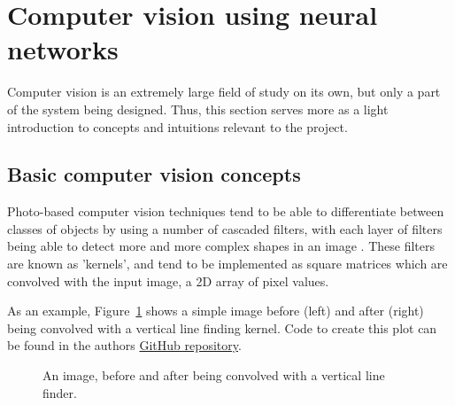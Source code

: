 \section{Computer vision using neural networks}

Computer vision is an extremely large field of study on its own, but only a part of the system being designed. Thus, this section serves more as a light introduction to concepts and intuitions relevant to the project.

\subsection{Basic computer vision concepts}
Photo-based computer vision techniques tend to be able to differentiate between classes of objects by using a number of cascaded filters, with each layer of filters being able to detect more and more complex shapes in an image \cite{website:cs231n_CNNs}. These filters are known as 'kernels', and tend to be implemented as square matrices which are convolved with the input image, a 2D array of pixel values.

As an example, Figure~\ref{fig:input_output_simple_filter} shows a simple image before (left) and after (right) being convolved with a vertical line finding kernel. Code to create this plot can be found in the authors \href{https://github.com/alknemeyer/EEE4022S-Thesis-Project/blob/master/Final%20code/Illustrations%20for%20report.ipynb}{GitHub repository}.

\begin{figure}[h!]%
    \centering
    \qquad \qquad
    \caption{An image, before and after being convolved with a vertical line finder.}%
    \label{fig:input_output_simple_filter}%
\end{figure}

